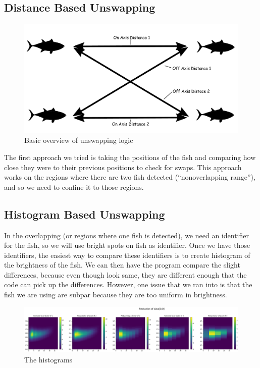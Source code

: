 \documentclass{article}
\begin{document}
\subsection{Distance Based Unswapping}
\begin{figure}[H]
	\centering
	\includegraphics[width=.75\linewidth]{fish2}
	\caption{Basic overview of unswapping logic}
\end{figure}
The first approach we tried is taking the positions of the fish and comparing how close they were to their previous positions to check for swaps. This approach works on the regions where there are two fish detected (``nonoverlapping range''), and so we need to confine it to those regions. 

\subsection{Histogram Based Unswapping}
In the overlapping (or regions where one fish is detected), we need an identifier for the fish, so we will use bright spots on fish as identifier. Once we have those identifiers, the easiest way to compare these identifiers is to create histogram of the brightness of the fish. We can then have the program compare the slight differences, because even though look same, they are different enough that the code can pick up the differences. However, one issue that we ran into is that the fish we are using are subpar because they are too uniform in brightness.

\begin{figure}[H]
	\centering
	\includegraphics[width=\linewidth]{reducedHist}
	\caption{The histograms}
	\label{fig:reducedHist}
\end{figure}
\end{document}
